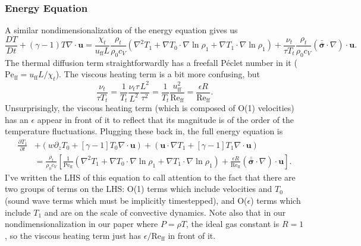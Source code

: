 \documentclass[aps, pre, onecolumn, nofootinbib, notitlepage, groupedaddress, amsfonts, amssymb, amsmath, longbibliography, superscriptaddress]{revtex4-1}
\newcommand{\grad}{\ensuremath{\nabla}}
\newcommand{\lilstressT}{\ensuremath{\bm{\bar{\bar{\sigma}}}}}
\begin{document}
\subsubsection{Energy Equation}
A similar nondimensionalization of the energy equation gives us
\begin{equation}
\frac{D T}{D t} + (\gamma-1)T \grad\cdot\bm{u} = 
\frac{\chi_t}{u_{\text{ff}} L}\frac{\rho_t}{\rho_0 c_V} (\grad^2 T_1 + \grad T_0\cdot\grad\ln\rho_1 + \grad T_1\cdot\grad\ln\rho_1)
+ \frac{\nu_t}{\tau T_t}\frac{\rho_t}{\rho_0 c_V} (\lilstressT\cdot\grad)\cdot\bm{u}.
\end{equation}
The thermal diffusion term straightforwardly has a freefall P\'{e}clet number in it ($\text{Pe}_{\text{ff}} = u_{\text{ff}} L / \chi_t$).
The viscous heating term is a bit more confusing, but
$$
\frac{\nu_t}{\tau T_t} = \frac{1}{T_t}\frac{\nu_t \tau}{L^2} \frac{L^2}{\tau^2} = \frac{1}{T_t}\frac{u_{\text{ff}}^2}{\text{Re}_{\text{ff}}} = \frac{\epsilon R}{\text{Re}_{\text{ff}}}.
$$
Unsurprisingly, the viscous heating term (which is composed of O(1) velocities) has an $\epsilon$ appear in front of it to reflect that its magnitude is of the order of the temperature fluctuations.
Plugging these back in, the full energy equation is
\begin{equation}
\begin{split}
\frac{\partial T_1}{\partial t} &+ (w \partial_z T_0 + [\gamma-1]T_0\grad\cdot\bm{u}) + (\bm{u}\cdot\grad T_1 + [\gamma-1] T_1\grad\cdot\bm{u})
\\
&= \frac{\rho_t}{\rho_0 c_V}\left[
\frac{1}{\text{Pe}_{\text{ff}}}(\grad^2 T_1 + \grad T_0 \cdot\grad\ln\rho_1 + \grad T_1 \cdot\grad\ln\rho_1)
+ \frac{\epsilon R}{\text{Re}_{\text{ff}}} (\lilstressT\cdot\grad)\cdot\bm{u}
\right].
\end{split}
\end{equation}
I've written the LHS of this equation to call attention to the fact that there are two groups of terms on the LHS: O(1) terms which include velocities and $T_0$ (sound wave terms which must be implicitly timestepped), and O($\epsilon$) terms which include $T_1$ and are on the scale of convective dynamics.
Note also that in our nondimensionalization in our paper where $P = \rho T$, the ideal gas constant is $R = 1$, so the viscous heating term just has $\epsilon/\text{Re}_{\text{ff}}$ in front of it.
\end{document}

